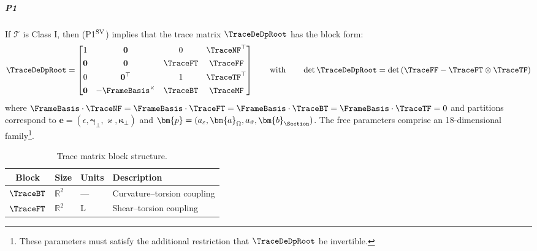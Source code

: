 \subparagraph{P1}
\begin{proposition}
\label{prop:plane-trace-structure}
If $\mathcal T$ is Class I, then (P1${}^{\rm SV}$) implies that the trace matrix
$\TraceDeDpRoot$ has the block form:
\begin{equation}
\TraceDeDpRoot = \begin{bmatrix}
1 & \mathbf{0} %
& 0 & \TraceNF^\top \\[4pt]
\mathbf{0} & \mathbf{0} & \TraceFT & \TraceFF \\[4pt] 
0 & \mathbf{0}^\top & 1 & \TraceTF^\top \\[4pt]
\mathbf{0} & -\FrameBasis^\times & \TraceBT & \TraceMF
\end{bmatrix}
\qquad\text{with}\qquad 
\operatorname{det}\TraceDeDpRoot = \operatorname{det}\left(\TraceFF - \TraceFT\otimes\TraceTF\right)
\label{eq:T0-plane-structure}
\end{equation}
where \(\FrameBasis\cdot\TraceNF = \FrameBasis\cdot\TraceFT = \FrameBasis\cdot\TraceBT = \FrameBasis\cdot\TraceTF = 0\) and partitions correspond to 
$\bm{e} = (\epsilon, \bm{\gamma}_\perp, \varkappa, \bm{\kappa}_\perp)$ 
and $\bm{p} = (a_\varepsilon, \bm{a}_\Omega, a_\vartheta, \bm{b}_{\Section})$.
The free parameters comprise an 18-dimensional family\footnote{These parameters must satisfy the additional restriction that $\TraceDeDpRoot$ be invertible.}.
\iftrue %
\begin{table}[H]
\begin{center}
\caption{Trace matrix block structure.}
\label{tab:T0-blocks}
\renewcommand{\arraystretch}{1.3}
\begin{tabular}{clll}
\toprule
Block & Size &  Units & Description \\ 
\midrule
$\TraceBT$ & $\mathbb{R}^2$  & --- 
& Curvature--torsion coupling \\
$\TraceFT$ & $\mathbb{R}^2$  & L 
& Shear--torsion coupling \\

\end{tabular}
\end{center}
\end{table}
\end{proposition}

